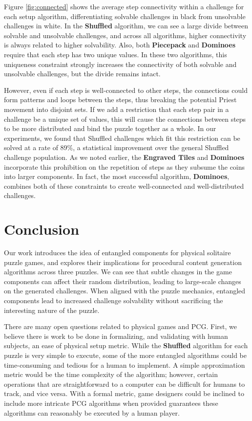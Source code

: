 \documentclass[journal]{IEEEtran}
\begin{document}
Figure \ref{fig:connected} shows the average step connectivity within a challenge for each setup algorithm, differentiating solvable challenges in black from unsolvable challenges in white. 
In the \textbf{Shuffled} algorithm, we can see a large divide between solvable and unsolvable challenges, and across all algorithms, higher connectivity is always related to higher solvability. Also, both \textbf{Piecepack} and \textbf{Dominoes} require that each step has two unique values. In these two algorithms, this uniqueness constraint strongly increases the connectivity of both solvable and unsolvable challenges, but the divide remains intact.

However, even if each step is well-connected to other steps, the connections could form patterns and loops between the steps, thus breaking the potential Priest movement into disjoint sets. If we add a restriction that each step pair in a challenge be a unique set of values, this will cause the connections between steps to be more distributed and bind the puzzle together as a whole. In our experiments, we found that Shuffled challenges which fit this restriction can be solved at a rate of 89\%, a statistical improvement over the general Shuffled challenge population. As we noted earlier, the {\bf Engraved Tiles} and {\bf Dominoes} incorporate this prohibition on the repetition of steps as they subsume the coins into larger components. In fact, the most successful algorithm, {\bf Dominoes}, combines both of these constraints to create well-connected and well-distributed challenges.


%

\section{Conclusion}   \label{sec:Conclusion}

\noindent
Our work introduces the idea of entangled components for physical solitaire puzzle games, and explores their implications for procedural content generation algorithms across three puzzles. We can see that subtle changes in the game components can affect their random distribution, leading to large-scale changes on the generated challenges. When aligned with the puzzle mechanics, entangled components lead to increased challenge solvability without sacrificing the interesting nature of the puzzle.

There are many open questions related to physical games and PCG. First, we believe there is work to be done in formalizing, and validating with human subjects, an ease of physical setup metric. While the \textbf{Shuffled} algorithm for each puzzle is very simple to execute, some of the more entangled algorithms could be time-consuming and tedious for a human to implement. A simple approximation metric would be the time complexity of the algorithm; however, certain operations that are straightforward to a computer can be difficult for humans to track, and vice versa. With a formal metric, game designers could be inclined to include more intricate PCG algorithms when provided guarantees these algorithms can reasonably be executed by a human player.
\end{document}
